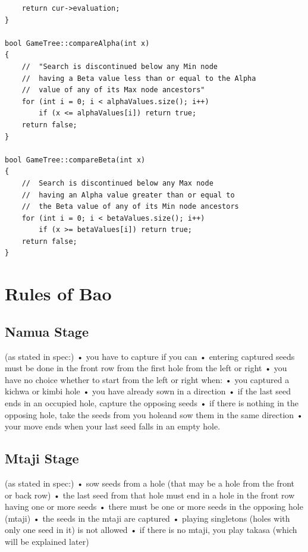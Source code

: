 \documentclass[a4paper]{article}
\begin{document}
\begin{lstlisting}
	return cur->evaluation;
}

bool GameTree::compareAlpha(int x)
{
	//	"Search is discontinued below any Min node
	//	having a Beta value less than or equal to the Alpha
	//	value of any of its Max node ancestors"
	for (int i = 0; i < alphaValues.size(); i++)
		if (x <= alphaValues[i]) return true;
	return false;
}

bool GameTree::compareBeta(int x)
{
	// 	Search is discontinued below any Max node
	// 	having an Alpha value greater than or equal to
	//	the Beta value of any of its Min node ancestors
	for (int i = 0; i < betaValues.size(); i++)
		if (x >= betaValues[i]) return true;
	return false;	
}
\end{lstlisting}


\section{Rules of Bao}
\subsection{Namua Stage}
(as stated in spec:)\newline
• you have to capture if you can\newline
• entering captured seeds must be done in the front row from the first hole from the left or right\newline
• you have no choice whether to start from the left or right when:\newline
• you captured a kichwa or kimbi hole\newline
• you have already sown in a direction\newline
• if the last seed ends in an occupied hole, capture the opposing seeds\newline
• if there is nothing in the opposing hole, take the seeds from you holeand sow them in the same direction\newline
• your move ends when your last seed falls in an empty hole.\newline
\subsection{Mtaji Stage}
(as stated in spec:)\newline
• sow seeds from a hole (that may be a hole from the front or back row)\newline
• the last seed from that hole must end in a hole in the front row having one or more seeds\newline
• there must be one or more seeds in the opposing hole (mtaji)\newline
• the seeds in the mtaji are captured\newline
• playing singletons (holes with only one seed in it) is not allowed\newline
• if there is no mtaji, you play takasa (which will be explained later)\newline
\end{document}
